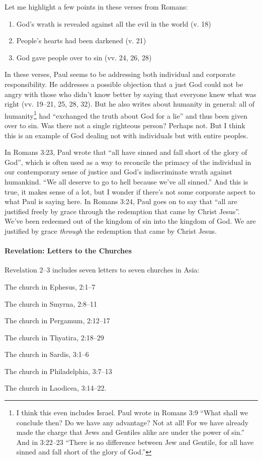 Let me highlight a few points in these verses from Romans:

\begin{enumerate}
    \item God's wrath is revealed against all the evil in the world (v. 18)
    \item People's hearts had been darkened (v. 21)
    \item God gave people over to sin (vv. 24, 26, 28)
\end{enumerate}

In these verses, Paul seems to be addressing both individual and corporate
responsibility. He addresses a possible objection that a just God could not be
angry with those who didn't know better by saying that everyone knew what was
right (vv. 19--21, 25, 28, 32). But he also writes about humanity in general:
all of humanity\footnote{%
I think this even includes Israel. Paul wrote in Romans 3:9 \enquote{What
shall we conclude then? Do we have any advantage? Not at all! For we have
already made the charge that Jews and Gentiles alike are under the power of
sin.} And in 3:22--23 \enquote{There is no difference between Jew and
Gentile, for all have sinned and fall short of the glory of God.}
} had \enquote{exchanged the truth about God for a lie} and thus been given over
to sin. Was there not a single righteous person? Perhaps not. But I think this
is an example of God dealing not with individuals but with entire peoples.

In Romans 3:23, Paul wrote that \enquote{all have sinned and fall short of the
glory of God}, which is often used as a way to reconcile the primacy of the
individual in our contemporary sense of justice and God's indiscriminate wrath
against humankind. \enquote{We all deserve to go to hell because we've all
sinned.} And this is true, it makes sense of a lot, but I wonder if there's not
some corporate aspect to what Paul is saying here. In Romans 3:24, Paul goes on
to say that \enquote{all are justified freely by grace through the redemption
that came by Christ Jesus}. We've been redeemed out of the kingdom of sin into
the kingdom of God. We are justified by grace \emph{through} the redemption that
came by Christ Jesus.

\paragraph{Revelation: Letters to the Churches} Revelation 2--3 includes seven
letters to seven churches in Asia:
\begin{inparaenum}[(1)]
    \item The church in Ephesus, 2:1--7
    \item The church in Smyrna, 2:8--11
    \item The church in Pergamum, 2:12--17
    \item The church in Thyatira, 2:18--29
    \item The church in Sardis, 3:1--6
    \item The church in Philadelphia, 3:7--13
    \item The church in Laodicea, 3:14--22.
\end{inparaenum}

